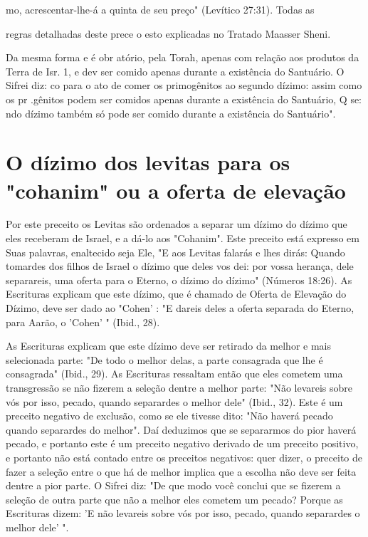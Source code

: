 \begin{itemize}
\begin{enumrate}
\begin{itemize}
\begin{itemize}
\begin{itemize}
mo, acrescentar-lhe-á a quinta de seu preço" (Levítico 27:31). Todas as

regras detalhadas deste prece o esto explicadas no Tratado Maasser
Sheni.

Da mesma forma e é obr atório, pela Torah, apenas com relação aos
produtos da Terra de Isr. 1, e dev ser comido apenas durante a
existência do Santuário. O Sifrei diz: co para o ato de comer os
primogênitos ao segundo dízimo: assim como os pr .gênitos podem ser
comidos apenas du­rante a existência do Santuário, Q se: ndo dízimo
também só pode ser comido durante a existência do Santuário".

\section{O dízimo dos levitas para os "cohanim" ou a oferta de elevação}

Por este preceito os Levitas são ordenados a separar um dízimo do dízimo
que eles receberam de Israel, e a dá-lo aos "Cohanim". Este preceito
está expresso em Suas palavras, enaltecido seja Ele, "E aos Levitas
falarás e lhes dirás: Quando tomardes dos filhos de Israel o dízimo que
deles vos dei: por vossa herança, dele separareis, uma oferta para o
Eterno, o dízimo do dízimo" (Números 18:26). As Escrituras explicam que
este dízimo, que é chamado de Oferta de Elevação do Dízimo, deve ser
dado ao "Cohen' : "E dareis deles a oferta separada do Eterno, para
Aarão, o 'Cohen' " (Ibid., 28).

As Escrituras explicam que este dízimo deve ser retirado da melhor e
mais selecionada parte: "De todo o melhor delas, a parte consagrada que
lhe é consagrada" (Ibid., 29). As Escrituras ressaltam então que eles
cometem uma transgressão se não fizerem a seleção dentre a melhor parte:
"Não levareis so­bre vós por isso, pecado, quando separardes o melhor
dele" (Ibid., 32). Este é um preceito negativo de exclusão, como se ele
tivesse dito: "Não haverá pe­cado quando separardes do melhor". Daí
deduzimos que se separarmos do pior haverá pecado, e portanto este é um
preceito negativo derivado de um precei­to positivo, e portanto não está
contado entre os preceitos negativos: quer di­zer, o preceito de fazer a
seleção entre o que há de melhor implica que a esco­lha não deve ser
feita dentre a pior parte. O Sifrei diz: "De que modo você con­clui que
se fizerem a seleção de outra parte que não a melhor eles cometem um
pecado? Porque as Escrituras dizem: 'E não levareis sobre vós por isso,
pe­cado, quando separardes o melhor dele' ".


\end{itemize}
\end{itemize}
\end{itemize}
\end{enumrate}
\end{itemize}

